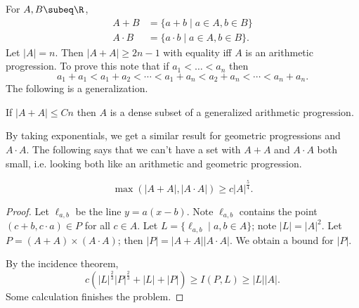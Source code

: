 For $A,B\subeq \R$,
\begin{align*}
A+B&=\{a+b\mid a\in A,b\in B\}\\
A\cdot B&=\{a\cdot b\mid a\in A,b\in B\}.
\end{align*}
Let $|A|=n$. Then $|A+A|\ge 2n-1$ with equality iff $A$ is an arithmetic progression. To prove this note that if $a_1<\ldots<a_n$ then
\[
a_1+a_1<a_1+a_2<\cdots <a_1+a_n<a_2+a_n<\cdots <a_n+a_n.
\]
The following is a generalization.
\begin{thm}
If $|A+A|\le Cn$ then $A$ is a dense subset of a generalized arithmetic progression.
\end{thm}
By taking exponentials, we get a similar result for geometric progressions and $A\cdot A$. The following says that we can't have a set with $A+A$ and $A\cdot A$ both small, i.e. looking both like an arithmetic and geometric progression.
\begin{thm}[Elekes]
\[
\max(|A+A|,|A\cdot A|)\ge c|A|^{\frac 54}.
\]
\end{thm}
\begin{proof}
Let $\ell_{a,b}$ be the line $y=a(x-b)$. Note $\ell_{a,b}$ contains the point $(c+b,c\cdot a)\in P$ for all $c\in A$. Let $L=\{\ell_{a,b}\mid a,b\in A\}$; note $|L|=|A|^2$. Let $P=(A+A)\times (A\cdot A)$; then $|P|=|A+A||A\cdot A|$. We obtain a bound for $|P|$.

By the incidence theorem,
\[
c(|L|^{\frac 23} |P|^{\frac 23} +|L|+|P|)\ge I(P,L)\ge |L||A|.
\]
Some calculation finishes the problem.
\end{proof}
%
